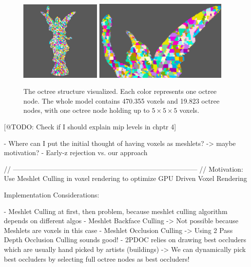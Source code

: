 \begin{figure}[h]
    \centering
    \includegraphics[width=151.5px]{images/graphics/lucy-voxel-octree-viz.png}
    \includegraphics[width=250px]{images/graphics/lucy-voxel-octree-viz-2.png}
    \caption{The octree structure visualized. Each color represents one octree node. The whole model contains 
    470.355 voxels and 19.823 octree nodes, with one octree node holding up to \begin{math} 5 \times 5 \times 5 \end{math}
    voxels.}
    \label{fig:voxel-octree-viz}
\end{figure}

\noindent


[@TODO: Check if I should explain mip levels in chptr 4]

- Where can I put the initial thought of having voxels as meshlets? -> maybe motivation? 
- Early-z rejection vs. our approach



// --------------------------------------------------------------------------------- //
Motivation:
Use Meshlet Culling in voxel rendering to optimize GPU Driven Voxel Rendering


Implementation Considerations:

- Meshlet Culling at first, then problem, because meshlet culling algorithm depends on different algos
    - Meshlet Backface Culling -> Not possible because Meshlets are voxels in this case
    - Meshlet Occlusion Culling -> Using 2 Pass Depth Occlusion Culling sounds good!
    - 2PDOC relies on drawing best occluders which are usually hand picked by artists (buildings)
        -> We can dynamically pick best occluders by selecting full octree nodes as best occluders!


